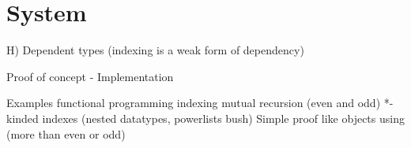 \section{System \Fi}\label{sec:Fi}
H) Dependent types (indexing is a weak form of dependency)

Proof of concept - Implementation

Examples
    functional programming
    indexing
    mutual recursion (even and odd)
    *-kinded indexes (nested datatypes, powerlists bush)
    Simple proof like objects using (more than even or odd)

